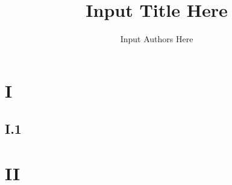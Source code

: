 \documentclass[10pt,twocolumn]{article}
\title{Input Title Here}
\author{Input Authors Here}
\date{}
\begin{document}
\maketitle

\section{I}


\subsection{I.1}

\section{II}



%
\end{document}
